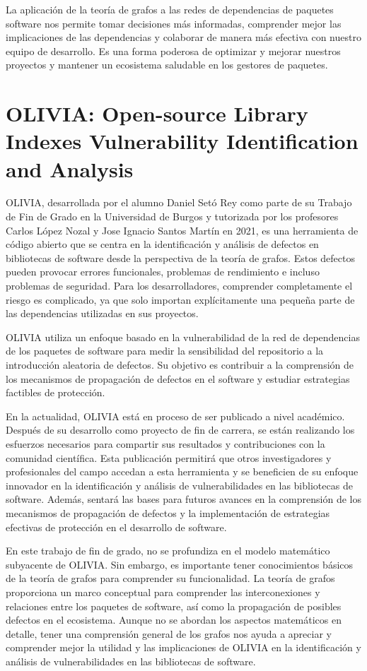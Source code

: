 La aplicación de la teoría de grafos a las redes de dependencias de paquetes software nos permite tomar decisiones más informadas, comprender mejor las implicaciones de las dependencias y colaborar de manera más efectiva con nuestro equipo de desarrollo. Es una forma poderosa de optimizar y mejorar nuestros proyectos y mantener un ecosistema saludable en los gestores de paquetes.

\section{OLIVIA: Open-source Library Indexes Vulnerability Identification and Analysis}

OLIVIA, desarrollada por el alumno Daniel Setó Rey como parte de su Trabajo de Fin de Grado en la Universidad de Burgos y tutorizada por los profesores Carlos López Nozal y Jose Ignacio Santos Martín en 2021, es una herramienta de código abierto que se centra en la identificación y análisis de defectos en bibliotecas de software desde la perspectiva de la teoría de grafos. Estos defectos pueden provocar errores funcionales, problemas de rendimiento e incluso problemas de seguridad. Para los desarrolladores, comprender completamente el riesgo es complicado, ya que solo importan explícitamente una pequeña parte de las dependencias utilizadas en sus proyectos.

OLIVIA utiliza un enfoque basado en la vulnerabilidad de la red de dependencias de los paquetes de software para medir la sensibilidad del repositorio a la introducción aleatoria de defectos. Su objetivo es contribuir a la comprensión de los mecanismos de propagación de defectos en el software y estudiar estrategias factibles de protección.

En la actualidad, OLIVIA está en proceso de ser publicado a nivel académico. Después de su desarrollo como proyecto de fin de carrera, se están realizando los esfuerzos necesarios para compartir sus resultados y contribuciones con la comunidad científica. Esta publicación permitirá que otros investigadores y profesionales del campo accedan a esta herramienta y se beneficien de su enfoque innovador en la identificación y análisis de vulnerabilidades en las bibliotecas de software. Además, sentará las bases para futuros avances en la comprensión de los mecanismos de propagación de defectos y la implementación de estrategias efectivas de protección en el desarrollo de software.

En este trabajo de fin de grado, no se profundiza en el modelo matemático subyacente de OLIVIA. Sin embargo, es importante tener conocimientos básicos de la teoría de grafos para comprender su funcionalidad. La teoría de grafos proporciona un marco conceptual para comprender las interconexiones y relaciones entre los paquetes de software, así como la propagación de posibles defectos en el ecosistema. Aunque no se abordan los aspectos matemáticos en detalle, tener una comprensión general de los grafos nos ayuda a apreciar y comprender mejor la utilidad y las implicaciones de OLIVIA en la identificación y análisis de vulnerabilidades en las bibliotecas de software.


